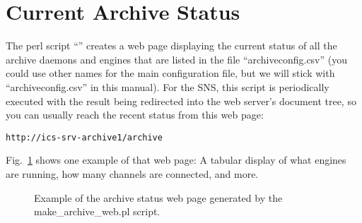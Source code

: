 \section{Current Archive Status} \label{sec:makearchweb}
The perl script ``'' creates a web page
displaying the current status of all the archive daemons and engines
that are listed in the file ``archiveconfig.csv''
(you could use other names for the main configuration file, but we
will stick with ``archiveconfig.csv'' in this manual).
For the SNS, this script is periodically executed with the result being
redirected into the web server's document tree, so you can usually
reach the recent status from this web page:
\begin{lstlisting}[frame=none,keywordstyle=\sffamily]
    http://ics-srv-archive1/archive
\end{lstlisting}
\noindent  Fig.~\ref{fig:archcfgstat} shows one example of that web
page: A tabular display of what engines are running, how many channels are
connected, and more.

\medskip

\begin{figure}[htb]
\begin{center}
\end{center}
\caption{\label{fig:archcfgstat}Example of the archive status web page
  generated by the make\_archive\_web.pl script.}
\end{figure}

